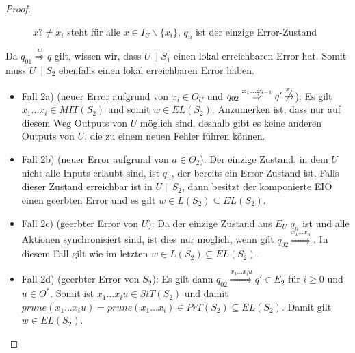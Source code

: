 \begin{proof}
\begin{itemize}
\begin{figure} [h!tbp]
\begin{center}
        \caption{$x?\neq x_i$ steht für alle $x\in I_U\backslash\{x_i\}$, $q_n$
          ist der einzige Error-Zustand}
        \label{UmitE}
      \end{center}
      \end{figure}
      Da $q_{01} \overset{w}{\Rightarrow} q$ gilt, wissen wir, dass $U\|S_1$
      einen lokal erreichbaren Error hat. Somit muss $U\|S_2$ ebenfalls einen
      lokal erreichbaren Error haben.
      \begin{itemize}
        \item Fall 2a) (neuer Error aufgrund von $x_i\in O_U$ und $q_{02}
          \overset{x_1\dots x_{i-1}}{\Rightarrow} q'
          \overset{x_i}{\not{\hspace{-0.1cm}\rightarrow}}$): Es gilt $x_1\dots
          x_i\in MIT(S_2)$ und somit $w\in EL(S_2)$. Anzumerken ist, dass nur
          auf diesem Weg Outputs von $U$ möglich sind, deshalb gibt es keine
          anderen Outputs von $U$, die zu einem neuen Fehler führen können.
        \item Fall 2b) (neuer Error aufgrund von $a\in O_2$): Der einzige
          Zustand, in dem $U$ nicht alle Inputs erlaubt sind, ist $q_n$, der
          bereits ein Error-Zustand ist. Falls dieser Zustand erreichbar ist in
          $U\|S_2$, dann besitzt der komponierte EIO einen geerbten Error und
          es gilt $w\in L(S_2)\subseteq EL(S_2)$.
        \item Fall 2c) (geerbter Error von $U$): Da der einzige Zustand aus
          $E_U$ $q_n$ ist und alle Aktionen synchronisiert sind, ist dies nur
          möglich, wenn gilt $q_{02} \overset{x_1\dots x_n}{\Rightarrow}$. In
          diesem Fall gilt wie im letzten $w\in L(S_2)\subseteq EL(S_2)$.
        \item Fall 2d) (geerbter Error von $S_2$): Es gilt dann $q_{02}
          \overset{x_1\dots x_iu}{\Rightarrow} q'\in E_2$ für $i\geq 0$ und
          $u\in O^*$. Somit ist $x_1\dots x_iu\in StT(S_2)$ und damit
          $prune(x_1\dots x_iu)=prune(x_1\dots x_i)\in PrT(S_2)\subseteq
          EL(S_2)$. Damit gilt $w\in EL(S_2)$.
      \end{itemize}
  \end{itemize}
\end{proof}

